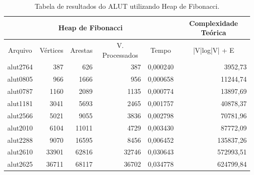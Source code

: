 \documentclass[
	12pt,				%
	oneside,			%
	a4paper,			%
	english,			%
	french,				%
	spanish,			%
	brazil,				%
	]{abntex2}
\begin{document}
\begin{table}[H]
  \centering    
  \begin{tabular}{|c|r|r|r|r|r|}
    \toprule
    \multicolumn{5}{|c|}{\cellcolor{gray!25}\textbf{Heap de Fibonacci}} & \multicolumn{1}{|c|}{\cellcolor{gray!25}\textbf{Complexidade Teórica}}\\
    \midrule
    \multicolumn{1}{|c|}{\cellcolor{gray!10}Arquivo} & \multicolumn{1}{|c|}{\cellcolor{gray!10}Vértices} & \multicolumn{1}{|c|}{\cellcolor{gray!10}Arestas} & \multicolumn{1}{|c|}{\cellcolor{gray!10}V. Processados} & \multicolumn{1}{|c|}{\cellcolor{gray!10}Tempo} & \multicolumn{1}{|c|}{\cellcolor{gray!10}|V|log|V| + E}\\
    \hline
    alut2764 &	387	&	626	&	387	&	0,000240	&	3952,73	\\
    \hline
    alut0805 &	966	&	1666	&	956	&	0,000658	&	11244,74	\\
    \hline
    alut0787 &	1160	&	2089	&	1135	&	0,000774	&	13897,69	\\
    \hline
    alut1181 &	3041	&	5693	&	2465	&	0,001757	&	40878,37	\\
    \hline
    alut2566 &	5021	&	9055	&	3836	&	0,002798	&	70781,96	\\
    \hline
    alut2010 &	6104	&	11011	&	4729	&	0,003430	&	87772,09	\\
    \hline
    alut2288 &	9070	&	16595	&	8456	&	0,006452	&	135837,26	\\
    \hline
    alut2610 &	33901	&	62816	&	32746	&	0,030643	&	572993,51	\\
    \hline
    alut2625 &	36711	&	68117	&	36702	&	0,034778	&	624799,84	\\
    \hline
  \end{tabular}
  \caption{Tabela de resultados do ALUT utilizando Heap de Fibonacci.}  
  \label{tab:AlutHeap}
\end{table}
\end{document}
